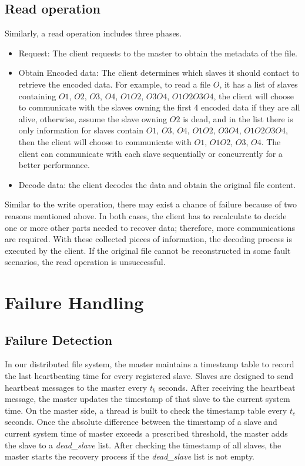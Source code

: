 \documentclass[conference]{IEEEtran}
\begin{document}
\subsection{Read operation}
Similarly, a read operation includes three phases.
\begin{itemize}
\item Request: The client requests to the master to obtain the metadata of the file.
\item Obtain Encoded data:  The client determines which slaves it should contact to retrieve the encoded data. For example, to read a file $O$, it has a list of slaves containing $O1$, $O2$, $O3$, $O4$, $O1O2$, $O3O4$, $O1O2O3O4$, the client will choose to communicate with the slaves owning the first 4 encoded data if they are all alive, otherwise, assume the slave owning $O2$ is dead, and in the list there is only information for slaves contain $O1$, $O3$, $O4$, $O1O2$, $O3O4$, $O1O2O3O4$, then the client will choose to communicate with $O1$, $O1O2$, $O3$, $O4$. The client can communicate with each slave sequentially or concurrently for a better performance.
\item Decode data: the client decodes the data and obtain the  original file content.
\end{itemize}
Similar to the write operation, there may exist a chance of failure because of two  reasons mentioned above. In both cases, the client has to recalculate to decide one or more other parts needed to recover data; therefore, more communications are required. With these collected pieces of information, the decoding process is executed by the client. If the original file cannot be reconstructed in some fault scenarios, the read operation is unsuccessful.




\section{Failure Handling}
\subsection{Failure Detection}
In our distributed file system, the master maintains a timestamp table to record the last heartbeating time for every registered slave. Slaves are designed to send heartbeat messages to the master every $t_b$ seconds. After receiving the heartbeat message, the master updates the timestamp of that slave to the current system time. On the master side, a thread is built to check the timestamp table every $t_c$ seconds. Once the absolute difference between the timestamp of a slave and current system time of master exceeds a prescribed threshold, the master adds the slave to a \textit{dead\_slave}  list. After checking the timestamp of all slaves, the master starts the recovery process if the \textit{dead\_slave} list is not empty.
\end{document}
